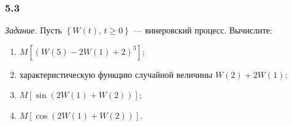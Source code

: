 \subsubsection*{5.3}

\textit{Задание.}
Пусть $ \left\{ W \left( t \right), \, t \geq 0 \right\} $ --- винеровский процесс.
Вычислите:
\begin{enumerate}[label=\alph*)]
  \item $M \left[ \left( W \left( 5 \right) - 2W \left( 1 \right) + 2 \right)^3 \right] $;
  \item характеристическую функцию случайной величины $W \left( 2 \right) + 2W \left( 1 \right) $;
  \item $M \left[ \sin \left( 2W \left( 1 \right) + W \left( 2 \right) \right) \right] $;
  \item $M \left[ \cos \left( 2W \left( 1 \right) + W \left( 2 \right) \right) \right] $.
\end{enumerate}


